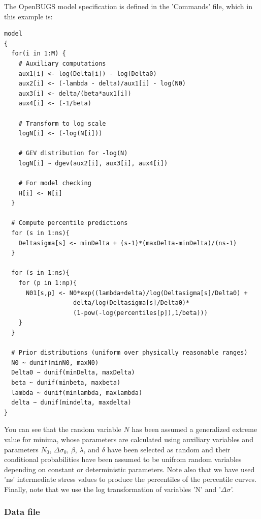 The OpenBUGS model specification is defined in the 'Commands' file, which in this example is:
\begin{codebox}
\begin{verbatim}
model
{
  for(i in 1:M) {
    # Auxiliary computations
    aux1[i] <- log(Delta[i]) - log(Delta0)
    aux2[i] <- (-lambda - delta)/aux1[i] - log(N0)
    aux3[i] <- delta/(beta*aux1[i])
    aux4[i] <- (-1/beta)

    # Transform to log scale
    logN[i] <- (-log(N[i]))

    # GEV distribution for -log(N)
    logN[i] ~ dgev(aux2[i], aux3[i], aux4[i])

    # For model checking
    H[i] <- N[i]
  }

  # Compute percentile predictions
  for (s in 1:ns){
    Deltasigma[s] <- minDelta + (s-1)*(maxDelta-minDelta)/(ns-1)
  }

  for (s in 1:ns){
    for (p in 1:np){
      N01[s,p] <- N0*exp((lambda+delta)/log(Deltasigma[s]/Delta0) +
                   delta/log(Deltasigma[s]/Delta0)*
                   (1-pow(-log(percentiles[p]),1/beta)))
    }
  }

  # Prior distributions (uniform over physically reasonable ranges)
  N0 ~ dunif(minN0, maxN0)
  Delta0 ~ dunif(minDelta, maxDelta)
  beta ~ dunif(minbeta, maxbeta)
  lambda ~ dunif(minlambda, maxlambda)
  delta ~ dunif(mindelta, maxdelta)
}
\end{verbatim}
\end{codebox}
You can see that the random variable $N$ has been assumed a generalized extreme value for minima, whose parameters are calculated using auxiliary variables and parameters $N_0$, $\Delta\sigma_0$, $\beta$, $\lambda$, and $\delta$ have been selected as random and their conditional probabilities have been assumed to be unifrom random variables depending on constant or deterministic parameters. Note also that we have used 'ns' intermediate stress values to produce the percentiles of the percentile curves. Finally, note that we use the log transformation of variables 'N' and '$\Delta\sigma$'.

\subsubsection*{Data file}

